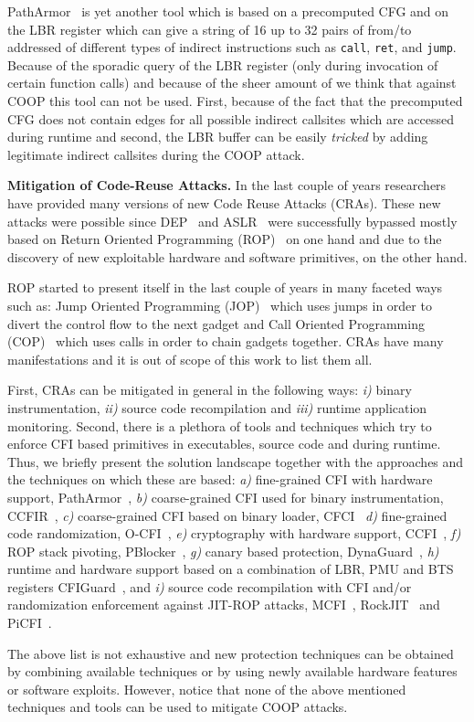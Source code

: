 PathArmor~\cite{veen:cfi} is yet another tool which is based on a precomputed CFG and on the LBR register which can give a string of 16 up to
32 pairs of from/to addressed of different types of indirect instructions such as \texttt{call}, \texttt{ret}, and \texttt{jump}. 
Because of the sporadic query of the LBR register (only during invocation of certain function calls) and because of the sheer amount of 
we think that against COOP this tool can not be used. First, because of the fact that the precomputed CFG does not contain edges for all
possible indirect callsites which are accessed during runtime and second, the LBR buffer can be easily \textit{tricked} by adding
legitimate indirect callsites  during the COOP attack.

\textbf{Mitigation of Code-Reuse Attacks.}
\label{Mitigation of Code-Reuse Attacks}
In the last couple of years researchers have provided many versions of new Code Reuse Attacks (CRAs).
These new attacks were possible since DEP~\cite{dep} and ASLR~\cite{ASLR} were successfully bypassed mostly based
on Return Oriented Programming (ROP)~\cite{ROP, kornau:rop, rop:shacham} on one hand and due to the discovery of 
new exploitable hardware and software primitives, on the other hand.

ROP started to present itself in the last couple of years in many faceted ways such as:
Jump Oriented Programming (JOP)~\cite{JOP1, JOP2, JOP3} which uses jumps in order to divert the control flow to the next gadget and 
Call Oriented Programming (COP)~\cite{rop:carlini} which uses calls in order to chain gadgets together.
CRAs have many manifestations and it is out of scope of this work to list them all.

First, CRAs can be mitigated in general in the following ways: 
\textit{i)} binary instrumentation,
\textit{ii)} source code recompilation and 
\textit{iii)} runtime application monitoring.
Second, there is a plethora of tools and techniques which try to enforce CFI based
primitives in executables, source code and during runtime. Thus, we briefly
present the solution landscape together with the approaches and the techniques on which these are based:
\textit{a)} fine-grained CFI with hardware support, PathArmor~\cite{veen:cfi},
\textit{b)} coarse-grained CFI used for binary instrumentation, CCFIR~\cite{ccfir:zhang},
\textit{c)} coarse-grained CFI based on binary loader, CFCI~\cite{cfci:zhang}
\textit{d)} fine-grained code randomization, O-CFI~\cite{mohan:opaque},
\textit{e)} cryptography with hardware support, CCFI~\cite{ccfi:jose},
\textit{f)} ROP stack pivoting, PBlocker~\cite{pblocker:prakash},
\textit{g)} canary based protection, DynaGuard~\cite{dynaguard:petsios},
\textit{h)} runtime and hardware support based on a combination of LBR, PMU and BTS registers CFIGuard~\cite{cfiguard:yuan}, and
\textit{i)} source code recompilation with CFI and/or randomization enforcement against JIT-ROP attacks, MCFI~\cite{mcfi:niu}, 
RockJIT~\cite{rockjit:niu} and PiCFI~\cite{perinput:niu}.

The above list is not exhaustive and new protection techniques can be obtained by combining available techniques
or by using newly available hardware features or software exploits. 
However, notice that none of the above mentioned techniques and tools can be used to mitigate COOP attacks.

